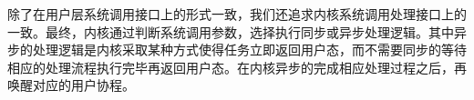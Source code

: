 除了在用户层系统调用接口上的形式一致，我们还追求内核系统调用处理接口上的一致。最终，内核通过判断系统调用参数，选择执行同步或异步处理逻辑。其中异步的处理逻辑是内核采取某种方式使得任务立即返回用户态，而不需要同步的等待相应的处理流程执行完毕再返回用户态。在内核异步的完成相应处理过程之后，再唤醒对应的用户协程。




